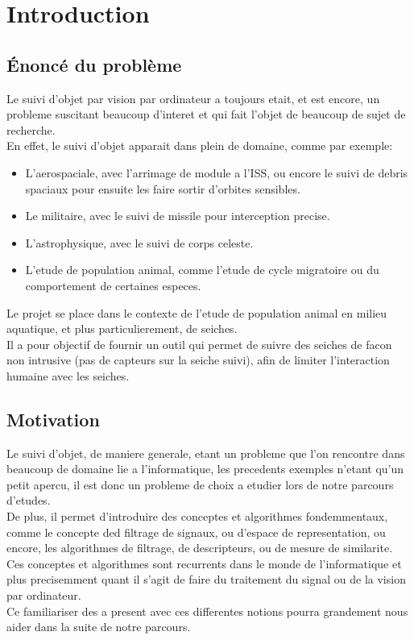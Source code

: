\chapter{Introduction}





\section{Énoncé du problème}
Le suivi d'objet par vision par ordinateur a toujours etait, et est encore, un probleme suscitant beaucoup d'interet et qui fait l'objet de beaucoup de sujet de recherche.\\
En effet, le suivi d'objet apparait dans plein de domaine, comme par exemple:
\begin{itemize}
	\item L'aerospaciale, avec l'arrimage de module a l'ISS, ou encore le suivi de debris spaciaux pour ensuite les faire sortir d'orbites sensibles.
	\item Le militaire, avec le suivi de missile pour interception precise.
	\item L'astrophysique, avec le suivi de corps celeste.
	\item L'etude de population animal, comme l'etude de cycle migratoire ou du comportement de certaines especes.\\
\end{itemize}

Le projet se place dans le contexte de l'etude de population animal en milieu aquatique, et plus particulierement, de seiches.\\
Il a pour objectif de fournir un outil qui permet de suivre des seiches de facon non intrusive (pas de capteurs sur la seiche suivi), afin de limiter l'interaction humaine avec les seiches.\\





\section{Motivation}
Le suivi d'objet, de maniere generale, etant un probleme que l'on rencontre dans beaucoup de domaine lie a l'informatique, les precedents exemples n'etant qu'un petit apercu, il est donc un probleme de choix a etudier lors de notre parcours d'etudes.\\
De plus, il permet d'introduire des conceptes et algorithmes fondemmentaux, comme le concepte ded filtrage de signaux, ou d'espace de representation, ou encore, les algorithmes de filtrage, de descripteurs, ou de mesure de similarite.\\
Ces conceptes et algorithmes sont recurrents dans le monde de l'informatique et plus precisemment quant il s'agit de faire du traitement du signal ou de la vision par ordinateur.\\
Ce familiariser des a present avec ces differentes notions pourra grandement nous aider dans la suite de notre parcours.\\



